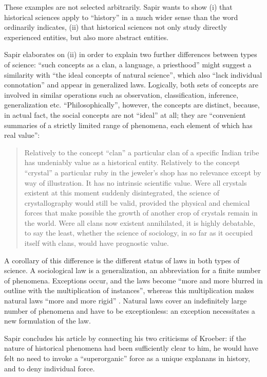 \documentclass[output=paper]{langscibook}
\begin{document}
These examples are not selected arbitrarily. Sapir wants to show (i) that historical sciences apply to ``history'' in a much wider sense than the word ordinarily indicates, (ii) that historical sciences not only study directly experienced entities, but also more abstract entities.

Sapir elaborates on (ii) in order to explain two further differences between types of science: ``such concepts as a clan, a language, a priesthood'' might suggest a similarity with ``the ideal concepts of natural science'', which also ``lack individual connotation'' and appear in generalized laws. Logically, both sets of concepts are involved in similar operations such as observation, classification, inference, generalization etc. ``Philosophically'', however, the concepts are distinct, because, in actual fact, the social concepts are not ``ideal'' at all; they are ``convenient summaries of a strictly limited range of phenomena, each element of which has real value'':

\begin{quotation}
    Relatively to the concept ``clan'' a particular clan of a specific Indian tribe has undeniably value as a historical entity. Relatively to the concept ``crystal'' a particular ruby in the jeweler's shop has no relevance except by way of illustration. It has no intrinsic scientific value. Were all crystals existent at this moment suddenly disintegrated, the science of crystallography would still be valid, provided the physical and chemical forces that make possible the growth of another crop of crystals remain in the world. Were all clans now existent annihilated, it is highly debatable, to say the least, whether the science of sociology, in so far as it occupied itself with clans, would have prognostic value.
    \citep[446--447]{Sapir1917}
\end{quotation}

A corollary of this difference is the different status of laws in both types of science. A sociological law is a generalization, an abbreviation for a finite number of phenomena. Exceptions occur, and the laws become ``more and more blurred in outline with the multiplication of instances'', whereas this multiplication makes natural laws ``more and more rigid'' \citep[447]{Sapir1917}. Natural laws cover an indefinitely large number of phenomena and have to be exceptionless: an exception necessitates a new formulation of the law.

Sapir concludes his article by connecting his two criticisms of Kroeber: if the nature of historical phenomena had been sufficiently clear to him, he would have felt no need to invoke a ``superorganic'' force as a unique explanans in history, and to deny individual force.
\end{document}

